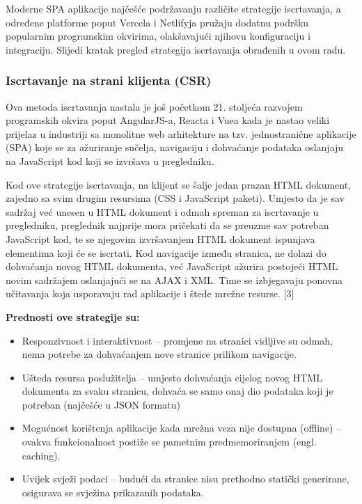 \bigskip

Moderne SPA aplikacije najčešće  podržavanju različite strategije iscrtavanja, a određene platforme poput Vercela i
Netlifyja pružaju dodatnu podršku popularnim programskim okvirima, olakšavajući njihovu konfiguraciju i integraciju. Slijedi kratak pregled strategija iscrtavanja obrađenih u ovom radu.

\subsubsection{Iscrtavanje na strani klijenta (CSR)}

Ova metoda iscrtavanja nastala je još početkom 21. stoljeća razvojem programskih okvira poput AngularJS-a, Reacta i Vuea kada je nastao veliki prijelaz u industriji sa monolitne web arhitekture na tzv. jednostranične aplikacije (SPA) koje se za ažuriranje sučelja, navigaciju i dohvaćanje podataka oslanjaju na JavaScript kod koji se izvršava u pregledniku.

\bigskip

Kod ove strategije iscrtavanja, na klijent se šalje jedan prazan HTML dokument, zajedno sa svim drugim resursima (CSS i JavaScript paketi). Umjesto da je sav sadržaj već unesen u HTML dokument i odmah spreman za iscrtavanje u pregledniku, preglednik najprije mora pričekati da se preuzme sav potreban JavaScript kod, te se njegovim izvršavanjem HTML dokument ispunjava elementima koji će se iscrtati. Kod navigacije između stranica, ne dolazi do dohvaćanja novog HTML dokumenta, već JavaScript ažurira postojeći HTML novim sadržajem oslanjajući se na AJAX i XML. Time se izbjegavaju ponovna učitavanja koja usporavaju rad aplikacije i štede mrežne resurse. [3]

\bigskip

\textbf{Prednosti ove strategije su:}

\begin{itemize}
    \item Responzivnost i interaktivnost – promjene na stranici vidljive su odmah, nema potrebe za dohvaćanjem nove stranice prilikom navigacije.
    \item Ušteda resursa poslužitelja – umjesto dohvaćanja cijelog novog HTML dokumenta za svaku stranicu, dohvaća se samo onaj dio podataka koji je potreban (najčešće u JSON formatu)
    \item Mogućnost korištenja aplikacije kada mrežna veza nije dostupna (offline) – ovakva funkcionalnost postiže se pametnim predmemoriranjem (engl. caching).
    \item Uvijek svježi podaci – budući da stranice nisu prethodno statički generirane, osigurava se svježina prikazanih podataka.
\end{itemize}

